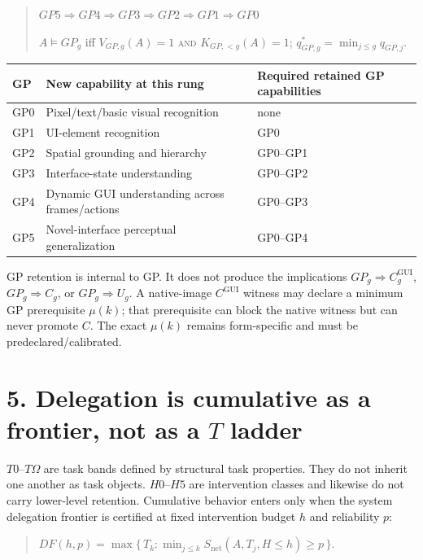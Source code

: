 \documentclass[11pt]{article}
\begin{document}
\begin{quote}
$GP5 \Rightarrow GP4 \Rightarrow GP3 \Rightarrow GP2 \Rightarrow GP1 \Rightarrow GP0$

$A \models GP_g$ iff $V_{GP,g}(A) = 1$ \textsc{and} $K_{GP,<g}(A) = 1$; $q^{*}_{GP,g} = \min_{j \le g} q_{GP,j}$.
\end{quote}

\small
\begin{tabularx}{\textwidth}{@{}>{\raggedright\arraybackslash}p{}>{\raggedright\arraybackslash}X>{\raggedright\arraybackslash}p{}@{}}
\toprule
GP & New capability at this rung & Required retained GP capabilities \\
\midrule
GP0 & Pixel/text/basic visual recognition & none \\
GP1 & UI-element recognition & GP0 \\
GP2 & Spatial grounding and hierarchy & GP0--GP1 \\
GP3 & Interface-state understanding & GP0--GP2 \\
GP4 & Dynamic GUI understanding across frames/actions & GP0--GP3 \\
GP5 & Novel-interface perceptual generalization & GP0--GP4 \\
\bottomrule
\end{tabularx}
\normalsize

GP retention is internal to GP. It does not produce the implications $GP_g \Rightarrow C^{\mathrm{GUI}}_g$, $GP_g \Rightarrow C_g$, or $GP_g \Rightarrow U_g$. A native-image $C^{\mathrm{GUI}}$ witness may declare a minimum GP prerequisite $\mu(k)$; that prerequisite can block the native witness but can never promote $C$. The exact $\mu(k)$ remains form-specific and must be predeclared/calibrated.

\section*{5. Delegation is cumulative as a frontier, not as a $T$ ladder}

$T0$--$T\Omega$ are task bands defined by structural task properties. They do not inherit one another as task objects. $H0$--$H5$ are intervention classes and likewise do not carry lower-level retention. Cumulative behavior enters only when the system delegation frontier is certified at fixed intervention budget $h$ and reliability $p$:

\begin{quote}
$DF(h,p) = \max \{\, T_k : \min_{j \le k} S_{\mathrm{net}}(A, T_j, H \le h) \ge p \,\}$.
\end{quote}
\end{document}
